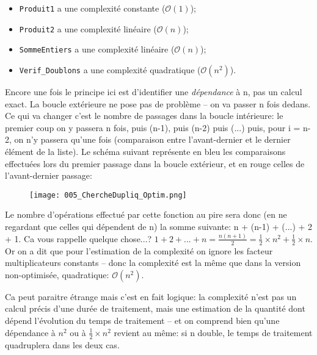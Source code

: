 \documentclass[12pt]{article}
\begin{document}
	\begin{MaReponse}
		\begin{alphenum}
			\item
			\begin{itemize}
				\item \texttt{Produit1} a une complexité constante ($\mathcal{O}(1)$);
				\item \texttt{Produit2} a une complexité linéaire ($\mathcal{O}(n)$);
				\item \texttt{SommeEntiers} a une complexité linéaire ($\mathcal{O}(n)$);
				\item \texttt{Verif\_Doublons} a une complexité quadratique ($\mathcal{O}(n^2)$).
			\end{itemize}
			\item Encore une fois le principe ici est d'identifier une \textit{dépendance} à n, pas un calcul exact. La boucle extérieure ne pose pas de problème -- on va passer n fois dedans. Ce qui va changer c'est le nombre de passages dans la boucle intérieure: le premier coup on y passera n fois, puis (n-1), puis (n-2) puis (...) puis, pour i = n-2, on n'y passera qu'une fois (comparaison entre l'avant-dernier et le dernier élément de la liste). Le schéma suivant représente en bleu les comparaisons effectuées lors du premier passage dans la boucle extérieur, et en rouge celles de l'avant-dernier passage:
			\begin{figure}[H]
				\centering
				\texttt{[image: 005\_ChercheDupliq\_Optim.png]}
			\end{figure}
			Le nombre d'opérations effectué par cette fonction au pire sera donc (en ne regardant que celles qui dépendent de n) la somme suivante: n + (n-1) + (...) + 2 + 1. Ca vous rappelle quelque chose...? $1 + 2 + ... + n = \frac{n(n + 1)}{2} = \frac{1}{2} \times n^2 + \frac{1}{2} \times n$. Or on a dit que pour l'estimation de la complexité on ignore les facteur multiplicateurs constants -- donc la complexité est la même que dans la version non-optimisée, quadratique: $\mathcal{O}(n^2)$.
			
			Ca peut paraitre étrange mais c'est en fait logique: la complexité n'est pas un calcul précis d'une durée de traitement, mais une estimation de la quantité dont dépend l'évolution du temps de traitement -- et on comprend bien qu'une dépendance à $n^2$ ou à $\frac{1}{2} \times n^2$ revient au même: si n double, le temps de traitement quadruplera dans les deux cas.
		\end{alphenum}
		
	\end{MaReponse}
\end{document}
